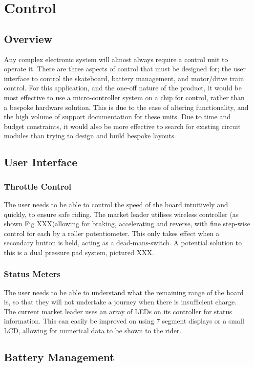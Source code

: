 \documentclass[journal,10pt]{IEEEtran}
\begin{document}
\section{Control}
    \subsection{Overview}
    	Any complex electronic system will almost always require a control unit to operate it.
    	There are three aspects of control that must be designed for; the user interface to control the skateboard, battery management, and motor/drive train control.
    	For this application, and the one-off nature of the product, it would be most effective to use a micro-controller system on a chip for control, rather than a bespoke hardware solution.
    	This is due to the ease of altering functionality, and the high volume of support documentation for these units.
    	Due to time and budget constraints, it would also be more effective to search for existing circuit modules than trying to design and build bespoke layouts.
    \subsection{User Interface}
    	\subsubsection{Throttle Control}
    		The user needs to be able to control the speed of the board intuitively and quickly, to ensure safe riding.
    		The market leader utilises wireless controller (as shown Fig XXX)allowing for braking, accelerating and reverse, with fine step-wise control for each by a roller potentiometer.
    		This only takes effect when a secondary button is held, acting as a dead-mans-switch.
    		A potential solution to this is a dual pressure pad system, pictured XXX.
    	\subsubsection{Status Meters}
    		The user needs to be able to understand what the remaining range of the board is, so that they will not undertake a journey when there is insufficient charge.
    	The current market leader uses an array of LEDs on its controller for status information.
    		This can easily be improved on using 7 segment displays or a small LCD, allowing for numerical data to be shown to the rider.
    \subsection{Battery Management}
\end{document}
